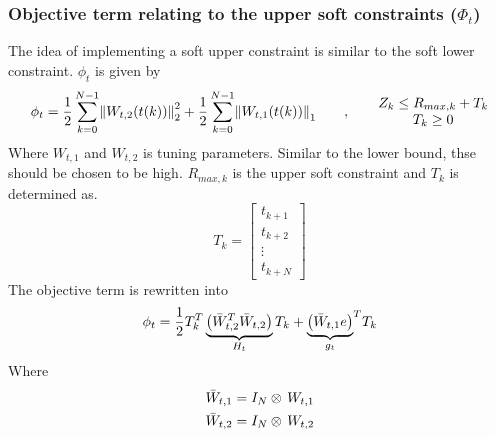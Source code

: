 \subsubsection*{Objective term relating to the upper soft constraints ($\Phi_t$)}
The idea of implementing a soft upper constraint is similar to the soft lower constraint.
$\phi_t$ is given by
\begin{equation}
       \phi_t=\frac{1}{2}\, \overset{N-1}{\underset{k=0}{\sum}}\norm{W_{t,2}(t(k))}_2^2+\frac{1}{2}\, \overset{N-1}{\underset{k=0}{\sum}}\norm{W_{t,1}(t(k))}_1 \qquad , \qquad
       \begin{matrix}
       Z_k\leq R_{max,k}+T_k \\ T_k\geq 0
       \end{matrix}
\end{equation}
Where $W_{t,1}$ and $W_{t,2}$ is tuning parameters. Similar to the lower bound, thse should be chosen to be high. $R_{max,k}$ is the upper soft constraint and $T_k$ is determined as.
\begin{equation}
    T_k=\begin{bmatrix} t_{k+1}\\ t_{k+2}\\ \vdots\\ t_{k+N} \end{bmatrix}
    \label{eq:soft_Tk}
\end{equation}
The objective term is rewritten into
\begin{equation}
     \phi_t=\frac{1}{2}T_k^T\underbrace{\left(\Bar{W}_{t,2}^T\Bar{W}_{t,2}\right)}_{H_t}T_k+{\underbrace{\left(\Bar{W}_{t,1} e\right)}_{g_t}}^TT_k
\end{equation}
Where 
\begin{equation}
    \begin{gathered}
        \Bar{W}_{t,1}=I_N\otimes\,W_{t,1}\\
        \Bar{W}_{t,2}=I_N\otimes\,W_{t,2}\\
    \end{gathered}
\end{equation}
